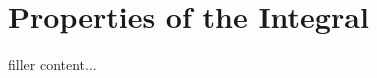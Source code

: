 \documentclass[../../templates/section]{subfiles}
\begin{document}
\section{Properties of the Integral}\label{sec:properties-of-the-integral}

filler content...
\end{document}
